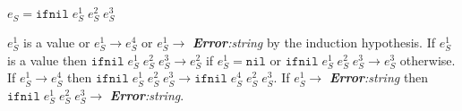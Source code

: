 \begin{case}
$e_{S}=\mathtt{ifnil}\;e_{S}^{1}\;e_{S}^{2}\;e_{S}^{3}$

$e_{S}^{1}$ is a value or $e_{S}^{1}\rightarrow e_{S}^{4}$ or $e_{S}^{1}\rightarrow$ \emph{\textbf{Error}:\;string} by the induction hypothesis.  If $e_{S}^{1}$ is a value then $\mathtt{ifnil}\;e_{S}^{1}\;e_{S}^{2}\;e_{S}^{3}\rightarrow e_{S}^{2}$ if $e_{S}^{1}=\mathtt{nil}$ or $\mathtt{ifnil}\;e_{S}^{1}\;e_{S}^{2}\;e_{S}^{3}\rightarrow e_{S}^{3}$ otherwise.  If $e_{S}^{1}\rightarrow e_{S}^{4}$ then $\mathtt{ifnil}\;e_{S}^{1}\;e_{S}^{2}\;e_{S}^{3}\rightarrow \mathtt{ifnil}\;e_{S}^{4}\;e_{S}^{2}\;e_{S}^{3}$.  If $e_{S}^{1}\rightarrow$ \emph{\textbf{Error}:\;string} then $\mathtt{ifnil}\;e_{S}^{1}\;e_{S}^{2}\;e_{S}^{3}\rightarrow$ \emph{\textbf{Error}:\;string}.
\end{case}